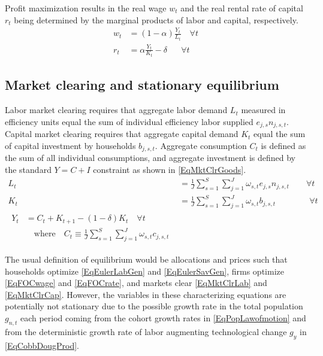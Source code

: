 \documentclass[letterpaper,12pt]{article}
\theoremstyle{definition}
\begin{document}
\begin{spacing}{1.5}
    Profit maximization results in the real wage $w_t$ and the real rental rate of capital $r_t$ being determined by the marginal products of labor and capital, respectively.
    \begin{align}
       w_t &= (1-\alpha)\frac{Y_t}{L_t} \quad \forall t \label{EqFOCwage}\\
       r_t &= \alpha\frac{Y_t}{K_t} - \delta \quad\:\:\: \forall t \label{EqFOCrate}
    \end{align}


  \subsection{Market clearing and stationary equilibrium}\label{SecMCEqlbm}

    Labor market clearing requires that aggregate labor demand $L_t$ measured in efficiency units equal the sum of individual efficiency labor supplied $e_{j,s}n_{j,s,t}$. Capital market clearing requires that aggregate capital demand $K_t$ equal the sum of capital investment by households $b_{j,s,t}$. Aggregate consumption $C_t$ is defined as the sum of all individual consumptions, and aggregate investment is defined by the standard $Y = C + I$ constraint as shown in \eqref{EqMktClrGoods}.
    \begin{align}
      L_t &= \frac{1}{J}\sum_{s=1}^S\sum_{j=1}^{J} \omega_{s,t}e_{j,s}n_{j,s,t} \quad\quad \forall t \label{EqMktClrLab} \\
      K_t &= \frac{1}{J}\sum_{s=1}^{S}\sum_{j=1}^{J}\omega_{s,t}b_{j,s,t} \quad\quad\quad\quad \forall t \label{EqMktClrCap} \\
      \begin{split}
        Y_t &= C_t + K_{t+1} - (1-\delta)K_t \quad\forall t \\
        &\quad\text{where}\quad C_t \equiv \frac{1}{J}\sum_{s=1}^{S}\sum_{j=1}^{J}\omega_{s,t}c_{j,s,t}
      \end{split} \label{EqMktClrGoods}
    \end{align}

    The usual definition of equilibrium would be allocations and prices such that households optimize \eqref{EqEulerLabGen} and \eqref{EqEulerSavGen}, firms optimize \eqref{EqFOCwage} and \eqref{EqFOCrate}, and markets clear \eqref{EqMktClrLab} and \eqref{EqMktClrCap}. However, the variables in these characterizing equations are potentially not stationary due to the possible growth rate in the total population $g_{n,t}$ each period coming from the cohort growth rates in \eqref{EqPopLawofmotion} and from the deterministic growth rate of labor augmenting technological change $g_y$ in \eqref{EqCobbDougProd}.


\end{spacing}
\end{document}
